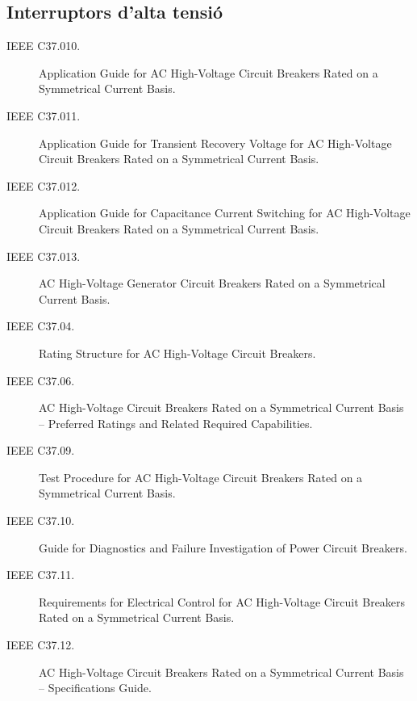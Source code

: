 \subsection*{Interruptors d'alta tensió}
\begin{description}
    \item [\hspace{5mm}IEEE C37.010.] Application Guide for AC High-Voltage Circuit Breakers Rated on a Symmetrical Current Basis.
    \item [\hspace{5mm}IEEE C37.011.] Application Guide for Transient Recovery Voltage for AC High-Voltage Circuit Breakers Rated on a Symmetrical Current Basis.
    \item [\hspace{5mm}IEEE C37.012.] Application Guide for Capacitance Current Switching for AC High-Voltage Circuit Breakers Rated on a Symmetrical Current Basis.
    \item [\hspace{5mm}IEEE C37.013.] AC High-Voltage Generator Circuit Breakers Rated on a Symmetrical Current Basis.
    \item [\hspace{5mm}IEEE C37.04.] Rating Structure for AC High-Voltage Circuit Breakers.
    \item [\hspace{5mm}IEEE C37.06.] AC High-Voltage Circuit Breakers Rated on a Symmetrical Current Basis -- Preferred Ratings and Related Required Capabilities.
    \item [\hspace{5mm}IEEE C37.09.] Test Procedure for AC High-Voltage Circuit Breakers Rated on a Symmetrical Current Basis.
    \item [\hspace{5mm}IEEE C37.10.] Guide for Diagnostics and Failure Investigation of Power Circuit Breakers.
    \item [\hspace{5mm}IEEE C37.11.] Requirements for Electrical Control for AC High-Voltage Circuit Breakers Rated on a Symmetrical Current Basis.
    \item [\hspace{5mm}IEEE C37.12.] AC High-Voltage Circuit Breakers Rated on a Symmetrical Current Basis -- Specifications Guide.
\end{description}


